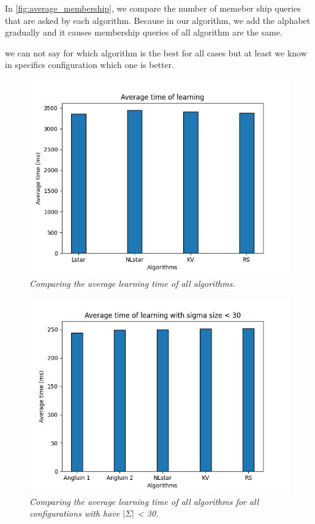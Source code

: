 In \autoref{fig:average_membership}, we compare the number of memeber ship queries that are asked by each algorithm.
Because in our algorithm, we add the alphabet gradually and it causes membership queries
of all algorithm are the same.

we can not say for which algorithm is the best for all cases but at least we know in specifics configuration
which one is better.
\begin{figure}[h]
    \centering
    \includegraphics[scale=0.75]{figures/average_time.png}
    \caption{\textit{Comparing the average learning time of all algorithms.}}
    \label{fig:average_time}
\end{figure}

\begin{figure}[h]
    \centering
    \includegraphics[scale=0.75]{figures/average_time2.png}
    \caption{\textit{Comparing the average learning time of all algorithms for all configurations with have $|\Sigma|$ < 30.}}
    \label{fig:average_time2}
\end{figure}

